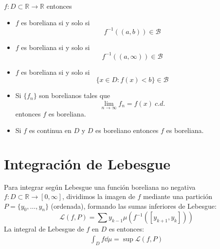 \documentclass{./Calculo.tex}
\begin{document}
\begin{teorema}
	$f: D \subset  \mathbb{R} \to \mathbb{R}$ entonces 
	\begin{itemize}
		\item $f$ es boreliana si y solo si 
			\[
				f^{-1}((a,b)) \in \mathcal{B}
			\]
		\item $f$ es boreliana si y solo si 
			\[
				f^{-1}((a, \infty)) \in \mathcal{B}
			\]
		\item $f$ es boreliana si y solo si 
			\[
				\{ x \in D : f(x) < b  \} \in \mathcal{B}
			\]
		\item Si $\{ f_{n} \}$ son borelianos tales que 
			\[
				\lim_{n \to \infty} f_{n} = f(x)~c.d.
			\]
			entonces $f$ es boreliana. 
		\item Si $f$ es continua en $D$ y $D$ es boreliano entonces $f$ es boreliana.    
	\end{itemize}
\end{teorema}
\section{Integración de Lebesgue}
Para integrar según Lebesgue una función boreliana no negativa $f: D \subset \mathbb{R} \to [0,\infty]$, dividimos la imagen de $f$ mediante una partición $P = \{ y_0,\dots ,y_{n} \}$ (ordenada), formando las sumas inferiores de Lebesgue:
\[
	\mathcal{L}(f,P) = \sum y_{k-1}\mu(f^{-1}([y_{k+1},y_{k}]))
\]
La integral de Lebesgue de $f$ en $D$ es entonces:
\begin{equation}
	\begin{split}
		\int_{D}f \dd{\mu} = \sup \mathcal{L}(f,P)
	\end{split}
\end{equation}
\end{document}
